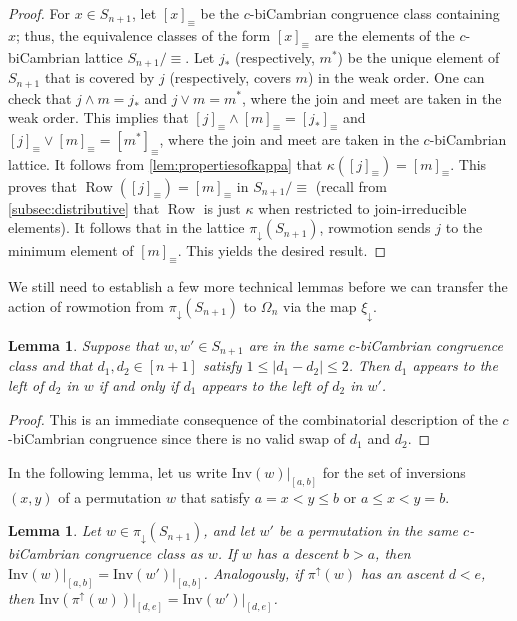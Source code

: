 \documentclass[11pt]{amsart}
\newtheorem{lemma}[theorem]{Lemma}
\theoremstyle{definition}
\DeclareMathOperator{\row}{Row}
\newcommand{\Inv}{\mathrm{Inv}}
\begin{document}
\begin{proof}
For $x\in S_{n+1}$, let $[x]_\equiv$ be the $c$-biCambrian congruence class containing $x$; thus, the equivalence classes of the form $[x]_\equiv$ are the elements of the $c$-biCambrian lattice $S_{n+1}/\equiv$. Let $j_*$ (respectively, $m^*$) be the unique element of $S_{n+1}$ that is covered by $j$ (respectively, covers $m$) in the weak order. One can check that $j\wedge m=j_*$ and $j\vee m=m^*$, where the join and meet are taken in the weak order. This implies that $[j]_\equiv\wedge[m]_\equiv=[j_*]_\equiv$ and $[j]_\equiv\vee[m]_\equiv=[m^*]_\equiv$, where the join and meet are taken in the $c$-biCambrian lattice. It follows from \cref{lem:propertiesofkappa} that $\kappa([j]_\equiv)=[m]_\equiv$. This proves that $\row([j]_\equiv)=[m]_\equiv$ in $S_{n+1}/\equiv$ (recall from \cref{subsec:distributive} that $\row$ is just $\kappa$ when restricted to join-irreducible elements). It follows that in the lattice $\pi_\downarrow(S_{n+1})$, rowmotion sends $j$ to the minimum element of $[m]_\equiv$. This yields the desired result. 
\end{proof}

We still need to establish a few more technical lemmas before we can transfer the action of rowmotion from $\pi_\downarrow(S_{n+1})$ to $\Omega_n$ via the map $\xi_\downarrow$. 

\begin{lemma}\label{lem:cannotswapatmosttwo}
    Suppose that $w,w'\in S_{n+1}$ are in the same $c$-biCambrian congruence class and that ${d_1,d_2\in [n+1]}$ satisfy $1\leq |d_1-d_2|\le 2$. Then $d_1$ appears to the left of $d_2$ in $w$ if and only if $d_1$ appears to the left of $d_2$ in $w'$.
\end{lemma}

\begin{proof}
    This is an immediate consequence of the combinatorial description of the $c$-biCambrian congruence since there is no valid swap of $d_1$ and $d_2$.
\end{proof}

In the following lemma, let us write $\Inv(w)\vert_{[a,b]}$ for the set of inversions $(x,y)$ of a permutation $w$ that satisfy $a=x<y\leq b$ or $a\leq x<y=b$.

\begin{lemma}\label{lem:relativeorderdoesnotchange}
    Let $w\in \pi_\downarrow(S_{n+1})$, and let $w'$ be a permutation in the same $c$-biCambrian congruence class as $w$. If $w$ has a descent $b>a$, then $\Inv(w)\vert_{[a,b]}=\Inv(w')\vert_{[a,b]}$. Analogously, if $\pi^\uparrow(w)$ has an ascent $d<e$, then $\Inv(\pi^\uparrow(w))\vert_{[d,e]}=\Inv(w')\vert_{[d,e]}$. 
\end{lemma}
\end{document}
